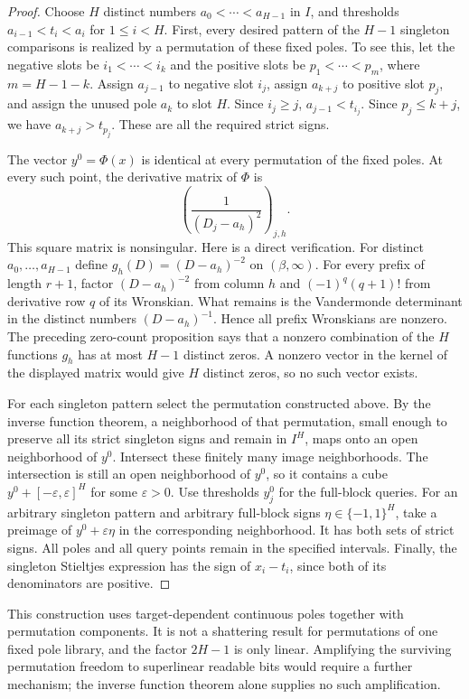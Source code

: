 \documentclass[11pt]{article}
\begin{document}
\begin{proof}
Choose $H$ distinct numbers
$a_0<\cdots<a_{H-1}$ in $I$, and thresholds
$a_{i-1}<t_i<a_i$ for $1\leq i<H$.
First, every desired pattern of the $H-1$ singleton comparisons is
realized by a permutation of these fixed poles. To see this, let the
negative slots be $i_1<\cdots<i_k$ and the positive slots be
$p_1<\cdots<p_m$, where $m=H-1-k$. Assign $a_{j-1}$ to negative
slot $i_j$, assign $a_{k+j}$ to positive slot $p_j$, and assign
the unused pole $a_k$ to slot $H$. Since $i_j\geq j$,
$a_{j-1}<t_{i_j}$. Since $p_j\leq k+j$, we have
$a_{k+j}>t_{p_j}$. These are all the required strict signs.

The vector $y^0=\Phi(x)$ is identical at every permutation of the
fixed poles. At every such point, the derivative matrix of $\Phi$ is
\[
 \left(\frac1{(D_j-a_h)^2}\right)_{j,h}.
\]
This square matrix is nonsingular. Here is a direct verification.
For distinct $a_0,\ldots,a_{H-1}$ define
$g_h(D)=(D-a_h)^{-2}$ on $(\beta,\infty)$. For every prefix of
length $r+1$, factor $(D-a_h)^{-2}$ from column $h$ and
$(-1)^q(q+1)!$ from derivative row $q$ of its Wronskian.
What remains is the Vandermonde determinant in the distinct numbers
$(D-a_h)^{-1}$. Hence all prefix Wronskians are nonzero.
The preceding zero-count proposition says that a nonzero combination
of the $H$ functions $g_h$ has at most $H-1$ distinct zeros. A
nonzero vector in the kernel of the displayed matrix would give $H$
distinct zeros, so no such vector exists.

For each singleton pattern select the permutation constructed above.
By the inverse function theorem, a neighborhood of that permutation,
small enough to preserve all its strict singleton signs and remain
in $I^H$, maps onto an open neighborhood of $y^0$. Intersect these
finitely many image neighborhoods. The intersection is still an
open neighborhood of $y^0$, so it contains a cube
$y^0+[-\varepsilon,\varepsilon]^H$ for some $\varepsilon>0$.
Use thresholds $y^0_j$ for the full-block queries. For an arbitrary
singleton pattern and arbitrary full-block signs
$\eta\in\{-1,1\}^H$, take a preimage of
$y^0+\varepsilon\eta$ in the corresponding neighborhood. It has
both sets of strict signs. All poles and all query points remain in
the specified intervals. Finally, the singleton Stieltjes expression
has the sign of $x_i-t_i$, since both of its denominators are
positive.
\end{proof}

This construction uses target-dependent continuous poles together with
permutation components. It is not a shattering result for permutations
of one fixed pole library, and the factor $2H-1$ is only linear.
Amplifying the surviving permutation freedom to superlinear readable
bits would require a further mechanism; the inverse function theorem
alone supplies no such amplification.
\end{document}
